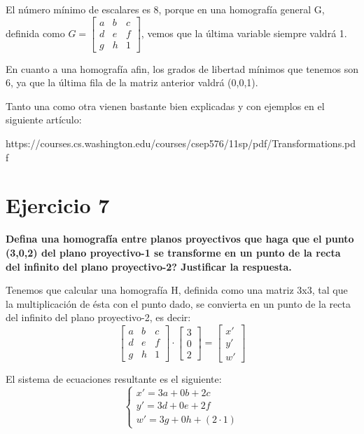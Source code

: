 \documentclass[11pt,a4paper]{article}
\begin{document}
El número mínimo de escalares es 8, porque en una homografía general G, definida como $G = \begin{bmatrix}a & b & c\\d & e & f \\g & h & 1\end{bmatrix}$,
vemos que la última variable siempre valdrá 1.

En cuanto a una homografía afin, los grados de libertad mínimos que tenemos son 6, ya que la última fila de la matriz anterior valdrá (0,0,1).

Tanto una como otra vienen bastante bien explicadas y con ejemplos en el siguiente artículo:

https://courses.cs.washington.edu/courses/csep576/11sp/pdf/Transformations.pdf


\section*{Ejercicio 7}
\textbf{Defina una homografía entre planos proyectivos que haga que el punto (3,0,2) del plano proyectivo-1 se transforme en un punto de la recta del
infinito del plano proyectivo-2? Justificar la respuesta.}

Tenemos que calcular una homografía H, definida como una matriz 3x3, tal que la multiplicación de ésta con el punto dado, se convierta en un punto de
la recta del infinito del plano proyectivo-2, es decir:
\begin{equation*}
\begin{bmatrix}a & b & c\\d & e & f \\g & h & 1\end{bmatrix}\cdot \begin{bmatrix}3\\0\\2\end{bmatrix} = \begin{bmatrix}x'\\y'\\w'\end{bmatrix}
\end{equation*}

El sistema de ecuaciones resultante es el siguiente:
\begin{equation*}\left\{\begin{matrix}
x' = 3a+0b+2c\\ 
y' = 3d+0e+2f\\ 
w' = 3g+0h+(2\cdot 1)
\end{matrix}\right.\end{equation*}
\end{document}
